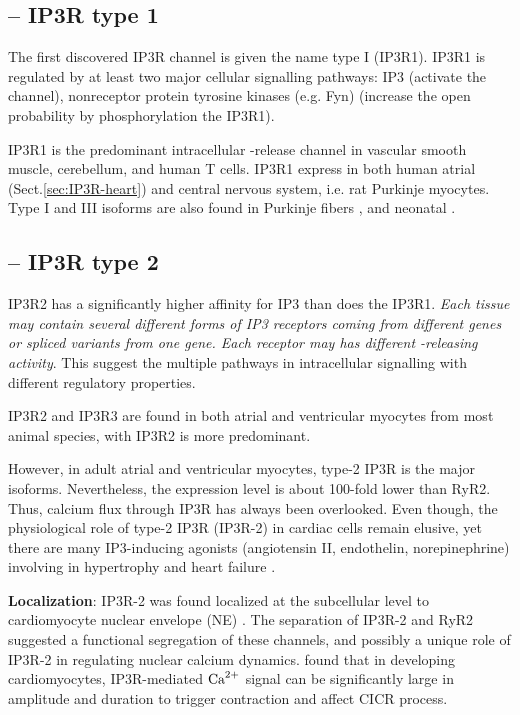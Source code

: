 \subsection{-- IP3R type 1}
\label{sec:IP3R-type1}

The first discovered IP3R channel is given the name type I (IP3R1). IP3R1 is
regulated by at least two major cellular signalling pathways: IP3 (activate the
channel), nonreceptor protein tyrosine kinases (e.g. Fyn) (increase the open
probability by phosphorylation the IP3R1).  

IP3R1 is the predominant intracellular -release channel in vascular
smooth muscle, cerebellum, and human T cells.
IP3R1 express in both human atrial (Sect.\ref{sec:IP3R-heart}) and central
nervous system, i.e. rat Purkinje myocytes\citep{nakanishi1991ip3r,
gorza1993ip3r,yamada2002ip3r}. Type I and III \tIPthreeR isoforms are also found
in Purkinje fibers \citep{bezprozvanny1991ip3r,li2005}, and neonatal
\citep{luo2008}.

\subsection{-- IP3R type 2}
\label{sec:IP3R-type2}
\label{sec:IP3R-2}

IP3R2 has a significantly higher affinity for IP3 than does the IP3R1.
{\it Each tissue may contain several different forms of IP3 receptors
coming from different genes or spliced variants from one gene. Each receptor
may has different -releasing activity}.
This suggest the multiple pathways in intracellular  signalling with
different regulatory properties.

IP3R2 and IP3R3 are found in both atrial and ventricular myocytes
from most animal species, with IP3R2 is more predominant.

However, in adult atrial and
ventricular myocytes, type-2 IP3R is the major isoforms\citep{woodcock1998,
li2005, lipp2000}. Nevertheless, the expression level is about 100-fold lower
than RyR2. Thus, calcium flux through IP3R has always been overlooked. Even though, the
physiological role of type-2 IP3R (IP3R-2) in cardiac cells remain elusive, yet
there are many IP3-inducing agonists (angiotensin II, endothelin,
norepinephrine) involving in hypertrophy and heart failure \citep{bare2005}.


{\bf Localization}: IP3R-2 was found localized at the subcellular level to
cardiomyocyte nuclear envelope (NE) \citep{bare2005, janowski2010}. The
separation of IP3R-2 and RyR2 suggested a functional segregation of these
channels, and possibly a unique role of IP3R-2 in regulating nuclear calcium
dynamics. \citep{janowski2010} found that in developing cardiomyocytes,
IP3R-mediated ${\text{Ca}^{2+}}$ signal can be significantly large in amplitude and duration
to trigger contraction and affect CICR process.


